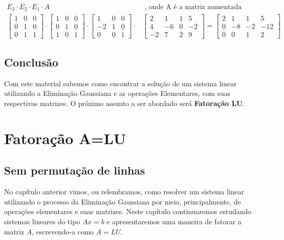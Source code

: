 \documentclass[12pt]{article}
\begin{document}
	\begin{align*}
		E_3\cdot E_2 \cdot E_1 \cdot A &\mbox{ , onde A é a matriz aumentada} \\
		\begin{bmatrix}
			1 & 0 &0\\
			0 & 1 & 0\\
			0 & 1 & 1
		\end{bmatrix}\cdot
		\begin{bmatrix}
			1 & 0 &0\\
			0 & 1 & 0\\
			1 & 0 & 1
		\end{bmatrix} \cdot
		\begin{bmatrix}
			1 & 0 &0\\
			-2 & 1 & 0\\
			0 & 0 & 1
		\end{bmatrix} \cdot&
		\begin{bmatrix}
			2 & 1 & 1 & 5\\
			4 & -6 & 0 & -2\\
			-2 & 7 & 2 & 9
		\end{bmatrix} = 
		\begin{bmatrix}
			2 & 1 & 1 & 5\\
			0 & -8 & -2 & -12\\
			0 & 0 & 1 & 2
		\end{bmatrix}
	\end{align*}
	
	\subsection{Conclusão}
	Com este material sabemos como encontrar a solução de um sistema linear utilizando a Eliminação Gaussiana e as operações Elementares, com suas respectivas matrizes. O próximo assunto a ser abordado será \textbf{Fatoração LU}.
	
	\newpage
	
	
	\section{Fatoração A=LU}
	
	\subsection{Sem permutação de linhas}
	
	No capítulo anterior vimos, ou relembramos,  como resolver um sistema linear utilizando o processo da Eliminação Gaussiana por meio, principalmente, de operações elementares e suas matrizes. Neste capítulo continuaremos estudando sistemas lineares do tipo $Ax=b$ e apresentaremos uma maneira de fatorar a matriz $A$, escrevendo-a como $A=LU$.\\
	
\end{document}
